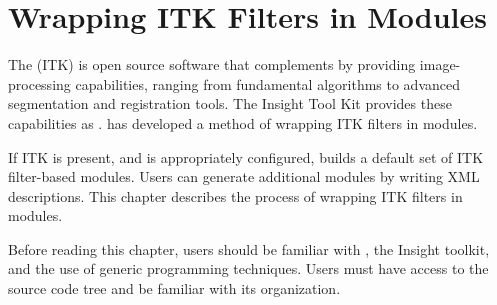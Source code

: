 %
% 
% 
% 
% 
% 
%



\chapter{Wrapping  ITK Filters in \sr{} Modules}
\label{ch:itk_mods}

The  (ITK)
is open source software that complements \sr{} by providing
image-processing capabilities, ranging from fundamental algorithms to
advanced segmentation and registration tools.  The Insight Tool Kit
provides these capabilities as .  \sci{} has developed a
method of wrapping ITK filters in \sr{} modules.

If ITK is present, and \sr{} is appropriately configured, \sr{} 
builds a default set of ITK filter-based modules.  Users can generate 
additional modules by writing XML descriptions. This chapter describes
the process of wrapping ITK filters in \sr{} modules.

Before reading this chapter, users should be familiar with \sr{}, the
Insight toolkit, and the use of generic programming techniques.  Users
must have access to the \sr{} source code tree and be familiar with
its organization.


